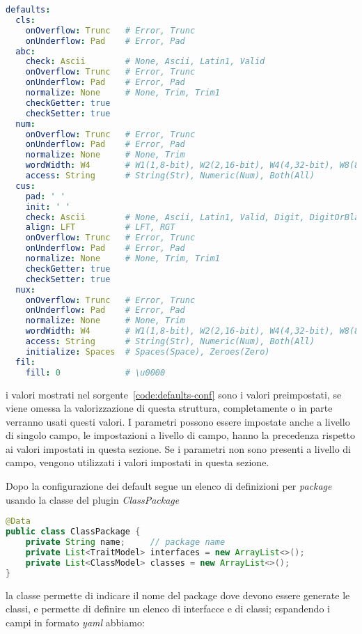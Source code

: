 \documentclass[a4paper,10pt]{report}
\begin{document}
\begin{lstlisting}[language=yaml, caption={configurazione, area default campi}, 
label=code:defaults-conf]
defaults:
  cls:
    onOverflow: Trunc   # Error, Trunc
    onUnderflow: Pad    # Error, Pad
  abc:
    check: Ascii        # None, Ascii, Latin1, Valid
    onOverflow: Trunc   # Error, Trunc
    onUnderflow: Pad    # Error, Pad
    normalize: None     # None, Trim, Trim1
    checkGetter: true
    checkSetter: true
  num:
    onOverflow: Trunc   # Error, Trunc
    onUnderflow: Pad    # Error, Pad
    normalize: None     # None, Trim
    wordWidth: W4       # W1(1,8-bit), W2(2,16-bit), W4(4,32-bit), W8(8,64-bit)
    access: String      # String(Str), Numeric(Num), Both(All)
  cus:
    pad: ' '
    init: ' '
    check: Ascii        # None, Ascii, Latin1, Valid, Digit, DigitOrBlank
    align: LFT          # LFT, RGT
    onOverflow: Trunc   # Error, Trunc
    onUnderflow: Pad    # Error, Pad
    normalize: None     # None, Trim, Trim1
    checkGetter: true
    checkSetter: true
  nux:
    onOverflow: Trunc   # Error, Trunc
    onUnderflow: Pad    # Error, Pad
    normalize: None     # None, Trim
    wordWidth: W4       # W1(1,8-bit), W2(2,16-bit), W4(4,32-bit), W8(8,64-bit)
    access: String      # String(Str), Numeric(Num), Both(All)
    initialize: Spaces  # Spaces(Space), Zeroes(Zero)
  fil:
    fill: 0             # \u0000

\end{lstlisting}
i valori mostrati nel sorgente~\ref{code:defaults-conf} sono i valori 
preimpostati, se viene omessa la valorizzazione di questa struttura, 
completamente o in parte verranno usati questi valori.
I parametri possono essere impostate anche a livello di singolo campo, le 
impostazioni a livello di campo, hanno la precedenza rispetto ai valori 
impostati in questa sezione. Se i parametri non sono presenti a livello di 
campo, vengono utilizzati i valori impostati in questa sezione.

Dopo la configurazione dei default segue un elenco di definizioni per 
\textsl{package} usando la classe del plugin \textsl{ClassPackage}

\begin{lstlisting}[language=java, caption=classe di configurazione ClassPackage, 
label=code:ClassPackage]
@Data
public class ClassPackage {
    private String name;     // package name
    private List<TraitModel> interfaces = new ArrayList<>();
    private List<ClassModel> classes = new ArrayList<>();
}
\end{lstlisting}
la classe permette di indicare il nome del package dove devono essere generate
le classi, e permette di definire un elenco di interfacce e di classi; 
espandendo i campi in formato \textit{yaml} abbiamo:
\end{document}
